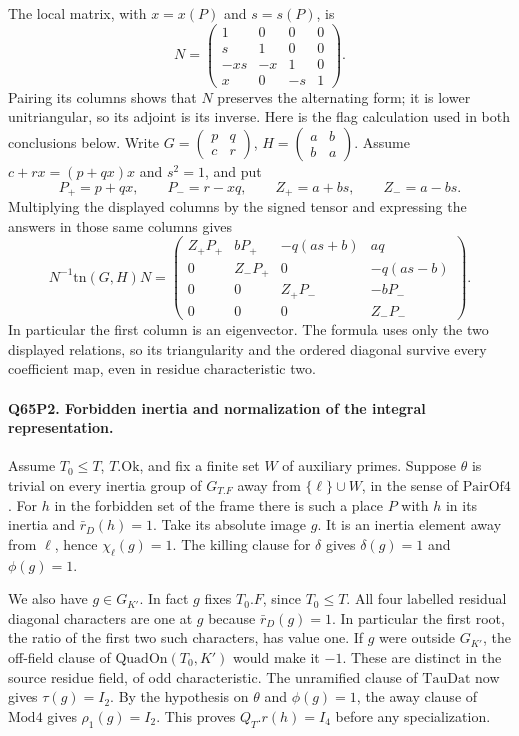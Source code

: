 The local matrix, with $x=x(P)$ and $s=s(P)$, is
\[
 N=\begin{pmatrix}
 1&0&0&0\\ s&1&0&0\\-xs&-x&1&0\\ x&0&-s&1
 \end{pmatrix}.
\]
Pairing its columns shows that $N$ preserves the alternating form;
it is lower unitriangular, so its adjoint is its inverse.
Here is the flag calculation used in both conclusions below.
Write $G=\left(\begin{smallmatrix}p&q\\c&r\end{smallmatrix}\right)$,
$H=\left(\begin{smallmatrix}a&b\\b&a\end{smallmatrix}\right)$.
Assume $c+rx=(p+qx)x$ and $s^2=1$, and put
\[
 P_+=p+qx,\qquad P_-=r-xq,\qquad Z_+=a+bs,\qquad Z_-=a-bs .
\]
Multiplying the displayed columns by the signed tensor and expressing
the answers in those same columns gives
\[
 N^{-1}\mathrm{tn}(G,H)N=
 \begin{pmatrix}
 Z_+P_+ & bP_+ &-q(as+b)&aq\\
 0& Z_-P_+ &0&-q(as-b)\\
 0&0& Z_+P_-&-bP_-\\
 0&0&0& Z_-P_-
 \end{pmatrix}.
\]
In particular the first column is an eigenvector. The formula uses
only the two displayed relations, so its triangularity and the
ordered diagonal survive every coefficient map, even in residue
characteristic two.

\paragraph{Q65P2. Forbidden inertia and normalization of the integral representation.}
Assume $T_0\le T$, $T.\mathrm{Ok}$, and fix a finite set $W$ of
auxiliary primes. Suppose $\theta$ is trivial on every inertia group
of $G_{T.F}$ away from $\{\ell\}\cup W$, in the sense of
$\mathrm{PairOf4}$. For $h$ in the forbidden set of the frame there
is such a place $P$ with $h$ in its inertia and $\bar r_D(h)=1$.
Take its absolute image $g$. It is an inertia element away from
$\ell$, hence $\chi_\ell(g)=1$. The killing clause for $\delta$
gives $\delta(g)=1$ and $\phi(g)=1$.

We also have $g\in G_{K'}$. In fact $g$ fixes $T_0.F$, since
$T_0\le T$. All four labelled residual diagonal characters are one
at $g$ because $\bar r_D(g)=1$. In particular the first root,
the ratio of the first two such characters, has value one.
If $g$ were outside $G_{K'}$, the off-field clause of
$\mathrm{QuadOn}(T_0,K')$ would make it $-1$. These are distinct
in the source residue field, of odd characteristic. The unramified
clause of $\mathrm{TauDat}$ now gives $\tau(g)=I_2$.
By the hypothesis on $\theta$ and $\phi(g)=1$, the away clause
of $\mathrm{Mod4}$ gives $\rho_1(g)=I_2$. This proves $Q_T.r(h)=I_4$
before any specialization.

